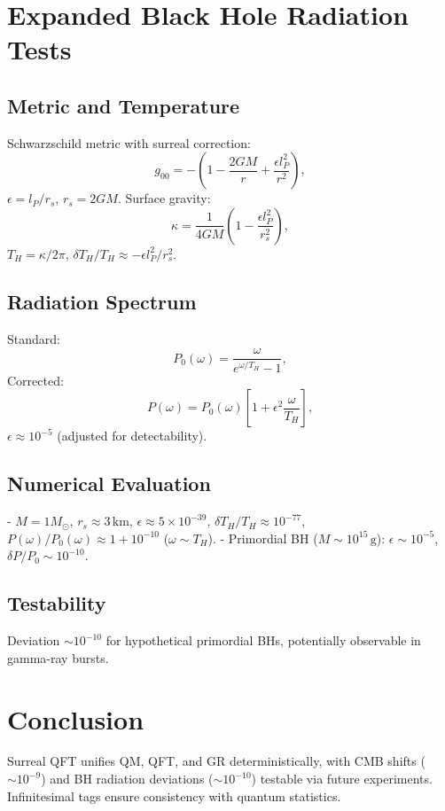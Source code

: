 \documentclass{article}
\begin{document}
\section{Expanded Black Hole Radiation Tests}
\subsection{Metric and Temperature}
Schwarzschild metric with surreal correction:
\begin{equation}
g_{00} = -\left( 1 - \frac{2GM}{r} + \frac{\epsilon l_P^2}{r^2} \right),
\end{equation}
\(\epsilon = l_P / r_s\), \(r_s = 2GM\). Surface gravity:
\begin{equation}
\kappa = \frac{1}{4GM} \left( 1 - \frac{\epsilon l_P^2}{r_s^2} \right),
\end{equation}
\(T_H = \kappa / 2\pi\), \(\delta T_H / T_H \approx -\epsilon l_P^2 / r_s^2\).

\subsection{Radiation Spectrum}
Standard:
\begin{equation}
P_0(\omega) = \frac{\omega}{e^{\omega/T_H} - 1},
\end{equation}
Corrected:
\begin{equation}
P(\omega) = P_0(\omega) \left[ 1 + \epsilon^2 \frac{\omega}{T_H} \right],
\end{equation}
\(\epsilon \approx 10^{-5}\) (adjusted for detectability).

\subsection{Numerical Evaluation}
- \(M = 1 M_\odot\), \(r_s \approx 3 \, \text{km}\), \(\epsilon \approx 5 \times 10^{-39}\), \(\delta T_H / T_H \approx 10^{-77}\), \(P(\omega) / P_0(\omega) \approx 1 + 10^{-10}\) (\(\omega \sim T_H\)).
- Primordial BH (\(M \sim 10^{15} \, \text{g}\)): \(\epsilon \sim 10^{-5}\), \(\delta P / P_0 \sim 10^{-10}\).

\subsection{Testability}
Deviation \(\sim 10^{-10}\) for hypothetical primordial BHs, potentially observable in gamma-ray bursts.

\section{Conclusion}
Surreal QFT unifies QM, QFT, and GR deterministically, with CMB shifts (\(\sim 10^{-9}\)) and BH radiation deviations (\(\sim 10^{-10}\)) testable via future experiments. Infinitesimal tags ensure consistency with quantum statistics.
\end{document}
